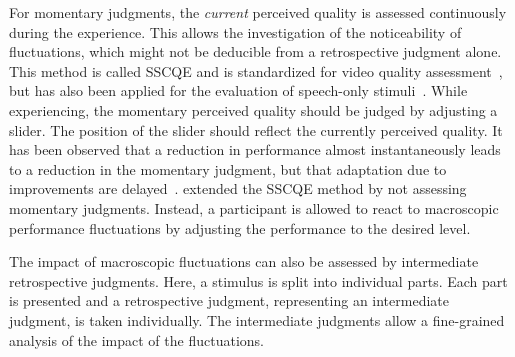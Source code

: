 For momentary judgments, the \emph{current} perceived quality is assessed continuously during the experience.
This allows the investigation of the noticeability of fluctuations, which might not be deducible from a retrospective judgment alone.
This method is called \ac{SSCQE} and is standardized for video quality assessment~\citep[][]{itu-r_recommendation_bt.500-13_methodology_2012}, but has also been applied for the evaluation of speech-only stimuli~\citep[\eg,][]{gros_instantaneous_2001}.
While experiencing, the momentary perceived quality should be judged by adjusting a slider.
The position of the slider should reflect the currently perceived quality.
It has been observed that a reduction in performance almost instantaneously leads to a reduction in the momentary judgment, but that adaptation due to improvements are delayed~\citep[\eg,][]{hands_recency_2001, gros_instantaneous_2001, hamberg_time-varying_1999}.
\citet{borowiak_long_2013} extended the \ac{SSCQE} method by not assessing momentary judgments.
Instead, a participant is allowed to react to macroscopic performance fluctuations by adjusting the performance to the desired level.

The impact of macroscopic fluctuations can also be assessed by intermediate retrospective judgments.
Here, a stimulus is split into individual parts.
Each part is presented and a retrospective judgment, representing an intermediate judgment, is taken individually.
The intermediate judgments allow a fine-grained analysis of the impact of the fluctuations.

